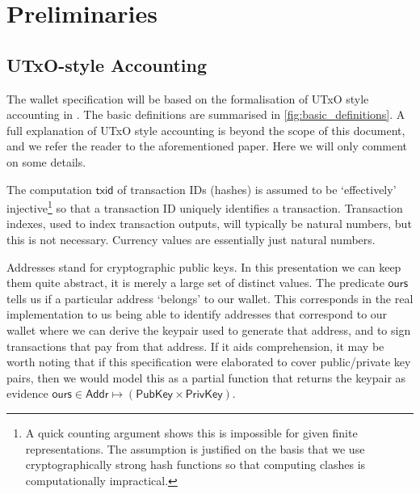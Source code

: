\documentclass{article}
\theoremstyle{definition}{
  \newtheorem{lemma}{Lemma}[section] %
  \newtheorem{definition}[lemma]{Definition}
}
\theoremstyle{theorem}{
  \newtheorem{invariant}[lemma]{Invariant}
  \newtheorem{proofobligation}[lemma]{Proof Obligation}
}
\numberwithin{equation}{lemma}
\begin{document}

\section{Preliminaries}

\subsection{UTxO-style Accounting}

The wallet specification will be based on the formalisation of UTxO style
accounting in \citep{utxo_accounting}. The basic definitions are summarised in
\cref{fig:basic_definitions}. A full explanation of UTxO style accounting
is beyond the scope of this document, and we refer the reader to the
aforementioned paper. Here we will only comment on some details.

The computation $\mathsf{txid}$ of transaction IDs (hashes) is assumed to be
`effectively' injective\footnote{A quick counting argument shows this is
impossible for given finite representations. The assumption is justified on the
basis that we use cryptographically strong hash functions so that computing
clashes is computationally impractical.} so that a transaction ID uniquely
identifies a transaction. Transaction indexes, used to index transaction
outputs, will typically be natural numbers, but this is not necessary. Currency
values are essentially just natural numbers.

Addresses stand for cryptographic public keys. In this presentation we can keep
them quite abstract, it is merely a large set of distinct values. The predicate
$\mathsf{ours}$ tells us if a particular address `belongs' to our wallet.
This corresponds in the real implementation to us being able to identify
addresses that correspond to our wallet where we can derive the keypair used
to generate that address, and to sign transactions that pay from that address.
If it aids comprehension, it may be worth noting that if this specification
were elaborated to cover public/private key pairs, then we would model this as
a partial function that returns the keypair as evidence
$\mathsf{ours} \in \mathsf{Addr} \mapsto (\mathsf{PubKey} \times \mathsf{PrivKey})$.
\end{document}
